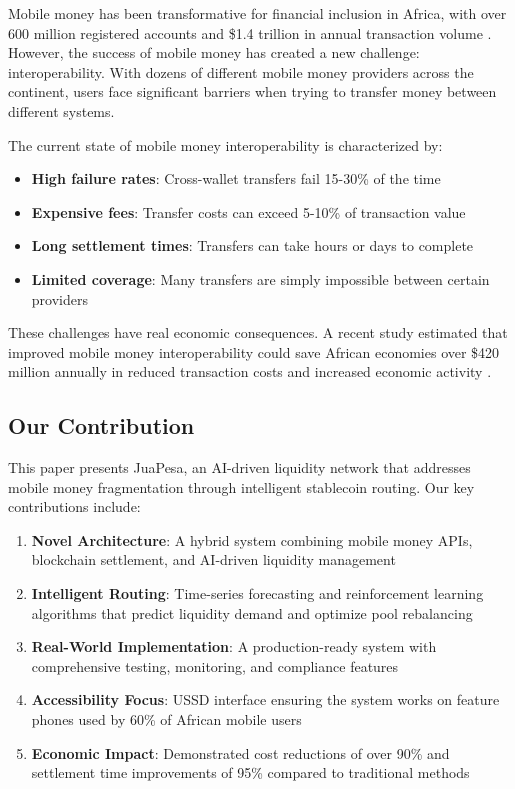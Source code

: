 \documentclass[11pt,a4paper]{article}
\begin{document}
Mobile money has been transformative for financial inclusion in Africa, with over 600 million registered accounts and \$1.4 trillion in annual transaction volume \cite{gsma2024}. However, the success of mobile money has created a new challenge: interoperability. With dozens of different mobile money providers across the continent, users face significant barriers when trying to transfer money between different systems.

The current state of mobile money interoperability is characterized by:
\begin{itemize}
    \item \textbf{High failure rates}: Cross-wallet transfers fail 15-30\% of the time
    \item \textbf{Expensive fees}: Transfer costs can exceed 5-10\% of transaction value
    \item \textbf{Long settlement times}: Transfers can take hours or days to complete
    \item \textbf{Limited coverage}: Many transfers are simply impossible between certain providers
\end{itemize}

These challenges have real economic consequences. A recent study estimated that improved mobile money interoperability could save African economies over \$420 million annually in reduced transaction costs and increased economic activity \cite{gsma2024}.

\subsection{Our Contribution}

This paper presents JuaPesa, an AI-driven liquidity network that addresses mobile money fragmentation through intelligent stablecoin routing. Our key contributions include:

\begin{enumerate}
    \item \textbf{Novel Architecture}: A hybrid system combining mobile money APIs, blockchain settlement, and AI-driven liquidity management
    \item \textbf{Intelligent Routing}: Time-series forecasting and reinforcement learning algorithms that predict liquidity demand and optimize pool rebalancing
    \item \textbf{Real-World Implementation}: A production-ready system with comprehensive testing, monitoring, and compliance features
    \item \textbf{Accessibility Focus}: USSD interface ensuring the system works on feature phones used by 60\% of African mobile users
    \item \textbf{Economic Impact}: Demonstrated cost reductions of over 90\% and settlement time improvements of 95\% compared to traditional methods
\end{enumerate}
\end{document}

